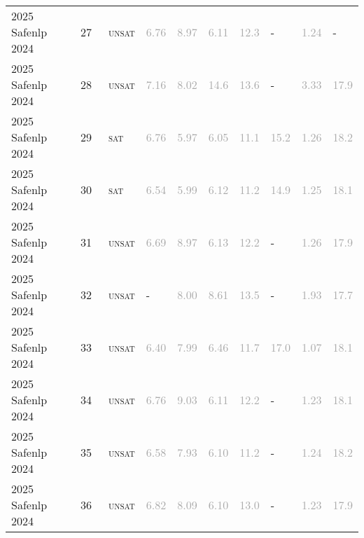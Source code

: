 \begin{center}
{\begin{longtable}{@{}llllllllll@{}}
2025 Safenlp 2024 & 27 & ~\textsc{unsat} & \textcolor{darkgray}{6.76} & \textcolor{darkgray}{8.97} & \textcolor{darkgray}{6.11} & \textcolor{darkgray}{12.3} & - & \textcolor{darkgray}{1.24} & - \\
2025 Safenlp 2024 & 28 & ~\textsc{unsat} & \textcolor{darkgray}{7.16} & \textcolor{darkgray}{8.02} & \textcolor{darkgray}{14.6} & \textcolor{darkgray}{13.6} & - & \textcolor{darkgray}{3.33} & \textcolor{darkgray}{17.9} \\
2025 Safenlp 2024 & 29 & ~\textsc{sat} & \textcolor{darkgray}{6.76} & \textcolor{darkgray}{5.97} & \textcolor{darkgray}{6.05} & \textcolor{darkgray}{11.1} & \textcolor{darkgray}{15.2} & \textcolor{darkgray}{1.26} & \textcolor{darkgray}{18.2} \\
2025 Safenlp 2024 & 30 & ~\textsc{sat} & \textcolor{darkgray}{6.54} & \textcolor{darkgray}{5.99} & \textcolor{darkgray}{6.12} & \textcolor{darkgray}{11.2} & \textcolor{darkgray}{14.9} & \textcolor{darkgray}{1.25} & \textcolor{darkgray}{18.1} \\
2025 Safenlp 2024 & 31 & ~\textsc{unsat} & \textcolor{darkgray}{6.69} & \textcolor{darkgray}{8.97} & \textcolor{darkgray}{6.13} & \textcolor{darkgray}{12.2} & - & \textcolor{darkgray}{1.26} & \textcolor{darkgray}{17.9} \\
2025 Safenlp 2024 & 32 & ~\textsc{unsat} & - & \textcolor{darkgray}{8.00} & \textcolor{darkgray}{8.61} & \textcolor{darkgray}{13.5} & - & \textcolor{darkgray}{1.93} & \textcolor{darkgray}{17.7} \\
2025 Safenlp 2024 & 33 & ~\textsc{unsat} & \textcolor{darkgray}{6.40} & \textcolor{darkgray}{7.99} & \textcolor{darkgray}{6.46} & \textcolor{darkgray}{11.7} & \textcolor{darkgray}{17.0} & \textcolor{darkgray}{1.07} & \textcolor{darkgray}{18.1} \\
2025 Safenlp 2024 & 34 & ~\textsc{unsat} & \textcolor{darkgray}{6.76} & \textcolor{darkgray}{9.03} & \textcolor{darkgray}{6.11} & \textcolor{darkgray}{12.2} & - & \textcolor{darkgray}{1.23} & \textcolor{darkgray}{18.1} \\
2025 Safenlp 2024 & 35 & ~\textsc{unsat} & \textcolor{darkgray}{6.58} & \textcolor{darkgray}{7.93} & \textcolor{darkgray}{6.10} & \textcolor{darkgray}{11.2} & - & \textcolor{darkgray}{1.24} & \textcolor{darkgray}{18.2} \\
2025 Safenlp 2024 & 36 & ~\textsc{unsat} & \textcolor{darkgray}{6.82} & \textcolor{darkgray}{8.09} & \textcolor{darkgray}{6.10} & \textcolor{darkgray}{13.0} & - & \textcolor{darkgray}{1.23} & \textcolor{darkgray}{17.9} \\

\end{longtable}}
\end{center}
